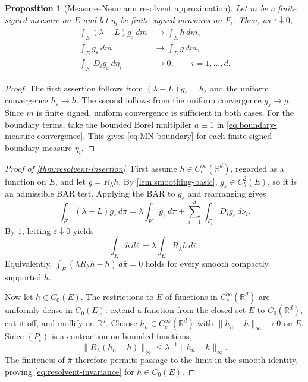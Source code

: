 \documentclass[aihp]{imsart}
\numberwithin{equation}{section}
\theoremstyle{plain}
\newtheorem{proposition}[proposition]{Proposition}
\theoremstyle{definition}
\newcommand{\1}{\mathbf 1}
\begin{document}
\begin{proposition}[Measure--Neumann resolvent approximation]\label{prop:measure-Neumann}
Let $m$ be a finite signed measure on $E$ and let $\eta_i$ be finite signed measures on $F_i$. Then, as $\varepsilon\downarrow0$,
\begin{align}
 \int_E(\lambda-L)g_\varepsilon\,dm
 &\longrightarrow\int_Eh\,dm,
 \label{eq:MN-interior}\\
 \int_Eg_\varepsilon\,dm
 &\longrightarrow\int_Eg\,dm,
 \label{eq:MN-function}\\
 \int_{F_i}D_i g_\varepsilon\,d\eta_i
 &\longrightarrow0,
 \qquad i=1,\ldots,d.
 \label{eq:MN-boundary}
\end{align}
\end{proposition}

\begin{proof}
The first assertion follows from $(\lambda-L)g_\varepsilon=h_\varepsilon$ and the uniform convergence $h_\varepsilon\to h$. The second follows from the uniform convergence $g_\varepsilon\to g$. Since $m$ is finite signed, uniform convergence is sufficient in both cases.
For the boundary terms, take the bounded Borel multiplier $a\equiv1$ in \eqref{eq:boundary-measure-convergence}. This gives \eqref{eq:MN-boundary} for each finite signed boundary measure $\eta_i$.
\end{proof}

\begin{proof}[Proof of \cref{thm:resolvent-insertion}]
First assume $h\in C_c^\infty(\mathbb R^d)$, regarded as a function on $E$, and let $g=R_\lambda h$. By \cref{lem:smoothing-basic}, $g_\varepsilon\in C_b^2(E)$, so it is an admissible BAR test. Applying the BAR to $g_\varepsilon$ and rearranging gives
\begin{equation}\label{eq:BAR-resolvent-rearranged}
 \int_E(\lambda-L)g_\varepsilon\,d\bar\pi
 =\lambda\int_Eg_\varepsilon\,d\bar\pi
 +\sum_{i=1}^d\int_{F_i}D_i g_\varepsilon\,d\bar\nu_i.
\end{equation}
By \cref{prop:measure-Neumann}, letting $\varepsilon\downarrow0$ yields
\[
 \int_E h\,d\bar\pi
 =\lambda\int_E R_\lambda h\,d\bar\pi.
\]
Equivalently, $\int_E(\lambda R_\lambda h-h)\,d\bar\pi=0$ holds for every smooth compactly supported $h$.

Now let $h\in C_0(E)$. The restrictions to $E$ of functions in $C_c^\infty(\mathbb R^d)$ are uniformly dense in $C_0(E)$: extend a function from the closed set $E$ to $C_0(\mathbb R^d)$, cut it off, and mollify on $\mathbb R^d$. Choose $h_n\in C_c^\infty(\mathbb R^d)$ with $\|h_n-h\|_\infty\to0$ on $E$. Since $(P_t)$ is a contraction on bounded functions,
\[
 \|R_\lambda(h_n-h)\|_\infty
 \le \lambda^{-1}\|h_n-h\|_\infty.
\]
The finiteness of $\bar\pi$ therefore permits passage to the limit in the smooth identity, proving \eqref{eq:resolvent-invariance} for $h\in C_0(E)$.
\end{proof}
\end{document}
